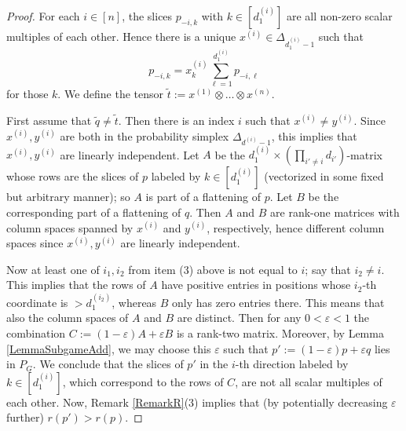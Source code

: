 \documentclass[11pt]{amsart}
\theoremstyle{definition}
\numberwithin{subcase}{case}
\renewcommand{\tilde}[1]{\widetilde{#1}}
\begin{document}
\begin{proof}
For each $i \in [n]$, the slices $p_{-i,k}$ with $k \in [d^{(i)}_1]$
are all non-zero scalar multiples of each other. Hence 
there is a unique $x^{(i)} \in \Delta_{d^{(i)}_1 -1}$ such that
\[p_{-i,k}= x^{(i)}_k  \sum_{\ell =1}^{d^{(i)}_1} p_{-i,\ell}\]
for those $k$. We define the tensor $\tilde{t} := x^{(1)} \otimes \dots \otimes x^{(n)}$.

First assume that $\tilde{q} \neq \tilde{t}$. Then there is an index $i$
such that $x^{(i)} \neq y^{(i)}$. Since $x^{(i)},y^{(i)}$ are both in the
probability simplex $\Delta_{d^{(i)}-1}$, this implies that
$x^{(i)},y^{(i)}$ are linearly independent. Let
$A$ be the $d^{(i)}_1 \times \left(\prod_{i' \neq i} d_{i'}\right)$-matrix whose
rows are the slices of $p$ labeled by $k \in [d^{(i)}_1]$ (vectorized in
some fixed but arbitrary manner); so $A$ is part of a
flattening of $p$. Let $B$ be the corresponding part of a flattening
of $q$. Then $A$ and $B$ are rank-one matrices with column spaces spanned
by $x^{(i)}$ and $y^{(i)}$, respectively, hence different column
spaces since $x^{(i)},y^{(i)}$ are linearly independent.

Now at least one of $i_1,i_2$ from item (3) above is not equal to $i$;
say that $i_2 \neq i$. This implies that the rows of $A$ have positive
entries in positions whose $i_2$-th coordinate is $>d^{(i_2)}_1$,
whereas $B$ only has zero entries there. This means that also the column
spaces of $A$ and $B$ are distinct.  Then for any $0 < \varepsilon <1$
the combination $C:=(1-\varepsilon)A + \varepsilon B$ is a rank-two matrix. 
Moreover, by Lemma \ref{LemmaSubgameAdd}, we may choose this
$\varepsilon$ such that $p':=(1-\varepsilon)p+\varepsilon q$ lies in $P_G$.
We conclude that the slices of $p'$ in the $i$-th direction labeled by
$k \in [d^{(i)}_1]$, which correspond to the rows of $C$, are not all
scalar multiples of each other. Now, Remark \ref{RemarkR}(3) implies that (by potentially decreasing $\varepsilon$ further) $r(p')>r(p)$. 


\end{proof}
\end{document}
